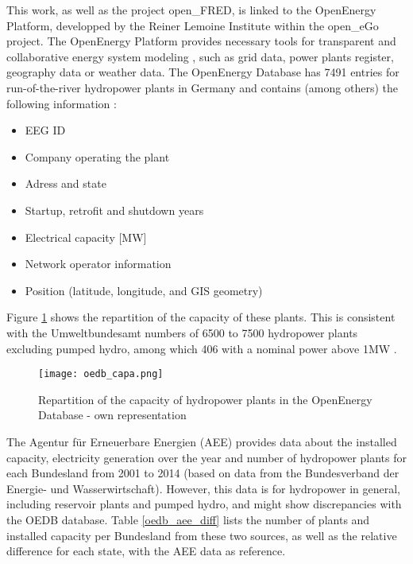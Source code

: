 This work, as well as the project open\_FRED, is linked to the OpenEnergy Platform, developped by the Reiner Lemoine Institute within the open\_eGo project. The OpenEnergy Platform provides necessary tools for transparent and collaborative energy system modeling \cite{oedb}, such as grid data, power plants register, geography data or weather data. The OpenEnergy Database has 7491 entries for run-of-the-river hydropower plants in Germany and contains (among others) the following information :
\begin{itemize}
\itemsep0em 
 \item EEG ID
 \item Company operating the plant
 \item Adress and state
 \item Startup, retrofit and shutdown years
 \item Electrical capacity [MW]
 \item Network operator information
 \item Position (latitude, longitude, and GIS geometry)
\end{itemize}


Figure \ref{oedb_capa} shows the repartition of the capacity of these plants. This is consistent with the Umweltbundesamt numbers of 6500 to 7500 hydropower plants excluding pumped hydro, among which 406 with a nominal power above 1MW \cite{uba_wasserkraft}. 

\begin{figure}[H]
\texttt{[image: oedb\_capa.png]}
\caption[Repartition of the capacity of hydropower plants in the OpenEnergy Database]{Repartition of the capacity of hydropower plants in the OpenEnergy Database - own representation}
\centering
\label{oedb_capa}
\end{figure}


The Agentur für Erneuerbare Energien (AEE) provides data about the installed capacity, electricity generation over the year and number of hydropower plants for each Bundesland \cite{aee} from 2001 to 2014 (based on data from the Bundesverband der Energie- und Wasserwirtschaft). However, this data is for hydropower in general, including reservoir plants and pumped hydro, and might show discrepancies with the OEDB database. Table \ref{oedb_aee_diff} lists the number of plants and installed capacity per Bundesland from these two sources, as well as the relative difference for each state, with the AEE data as reference.  

